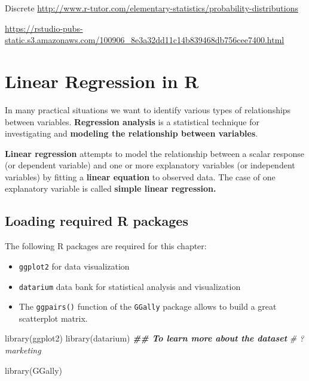 \documentclass[
]{book}
\newenvironment{Shaded}{\begin{snugshade}}{\end{snugshade}}
\newcommand{\CommentTok}[1]{\textcolor[rgb]{0.56,0.35,0.01}{\textit{#1}}}
\newcommand{\DocumentationTok}[1]{\textcolor[rgb]{0.56,0.35,0.01}{\textbf{\textit{#1}}}}
\newcommand{\FunctionTok}[1]{\textcolor[rgb]{0.00,0.00,0.00}{#1}}
\newcommand{\NormalTok}[1]{#1}
\providecommand{\tightlist}{%
  \setlength{\itemsep}{0pt}\setlength{\parskip}{0pt}}
\begin{document}
Discrete
\url{http://www.r-tutor.com/elementary-statistics/probability-distributions}

\url{https://rstudio-pubs-static.s3.amazonaws.com/100906_8e3a32dd11c14b839468db756cee7400.html}

\hypertarget{linear-regression-in-r}{%
\chapter*{Linear Regression in R}\label{linear-regression-in-r}}


In many practical situations we want to identify various types of relationships between variables. \textbf{Regression analysis} is a statistical technique for investigating and \textbf{modeling the relationship between variables}.

\textbf{Linear regression} attempts to model the relationship between a scalar response (or dependent variable) and one or more explanatory variables (or independent variables) by fitting a \textbf{linear equation} to observed data. The case of one explanatory variable is called \textbf{simple linear regression.}

\hypertarget{loading-required-r-packages}{%
\section{Loading required R packages}\label{loading-required-r-packages}}

The following R packages are required for this chapter:

\begin{itemize}
\tightlist
\item
  \texttt{ggplot2} for data visualization
\item
  \texttt{datarium} data bank for statistical analysis and visualization
\item
  The \texttt{ggpairs()} function of the \texttt{GGally} package allows to build a great scatterplot matrix.
\end{itemize}

\begin{Shaded}
\begin{Highlighting}[]
\FunctionTok{library}\NormalTok{(ggplot2)}
\FunctionTok{library}\NormalTok{(datarium)}
\DocumentationTok{\#\# To learn more about the dataset}
\CommentTok{\# ?marketing}

\FunctionTok{library}\NormalTok{(GGally)}
\end{Highlighting}
\end{Shaded}
\end{document}
